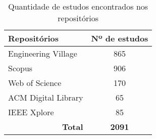 \begin{table}[!ht]
\centering
\caption{Quantidade de estudos encontrados nos repositórios}
\label{tab:rev:repositorios}
\begin{tabular}{|l|c|}
\hline
\textbf{Repositórios}                & \textbf{Nº de estudos} \\ \hline
Engineering Village                  & 865                    \\ \hline
Scopus                               & 906                    \\ \hline
Web of Science                       & 170                    \\ \hline
ACM Digital Library                  & 65                     \\ \hline
IEEE Xplore                          & 85                     \\ \hline
\multicolumn{1}{|r|}{\textbf{Total}} & \textbf{2091}          \\ \hline
\end{tabular}
\fdadospesquisa
\end{table}
